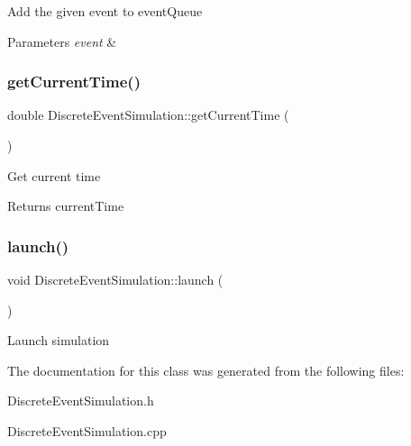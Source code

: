 Add the given event to event\+Queue 
\begin{DoxyParams}{Parameters}
{\em event} & \\
\hline
\end{DoxyParams}
\mbox{\label{classDiscreteEventSimulation_a41c5492fdf2d5ef2a9a27200871caabd}} 
\subsubsection{\texorpdfstring{get\+Current\+Time()}{getCurrentTime()}}
{\footnotesize\ttfamily double Discrete\+Event\+Simulation\+::get\+Current\+Time (\begin{DoxyParamCaption}{ }\end{DoxyParamCaption})}

Get current time \begin{DoxyReturn}{Returns}
current\+Time 
\end{DoxyReturn}
\mbox{\label{classDiscreteEventSimulation_aae616e227950798dc958171210975713}} 
\subsubsection{\texorpdfstring{launch()}{launch()}}
{\footnotesize\ttfamily void Discrete\+Event\+Simulation\+::launch (\begin{DoxyParamCaption}{ }\end{DoxyParamCaption})}

Launch simulation 

The documentation for this class was generated from the following files\+:\begin{DoxyCompactItemize}
\item 
Discrete\+Event\+Simulation.\+h\item 
Discrete\+Event\+Simulation.\+cpp\end{DoxyCompactItemize}
